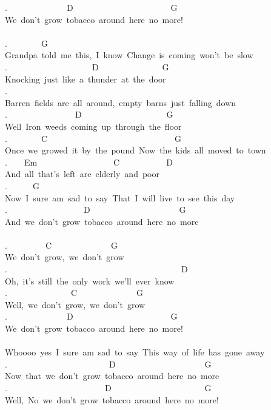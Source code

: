 {.\ \ \ \ \ \ \ \ \ \ \ \ \ \ D\ \ \ \ \ \ \ \ \ \ \ \ \ \ \ \ \ \ \ \ \ \ \ G\\
We\ don't\ grow\ tobacco\ around\ here\ no\ more!\\
\\
.\ \ \ \ \ \ \ \ G\\
Grandpa\ told\ me\ this,\ I\ know\ Change\ is\ coming\ won't\ be\ slow\\
.\ \ \ \ \ \ \ \ \ \ \ \ \ \ \ \ \ \ \ \ D\ \ \ \ \ \ \ \ \ \ \ \ \ \ \ G\\
Knocking\ just\ like\ a\ thunder\ at\ the\ door\\
.\\
Barren\ fields\ are\ all\ around,\ empty\ barns\ just\ falling\ down\\
.\ \ \ \ \ \ \ \ \ \ \ \ \ \ \ \ D\ \ \ \ \ \ \ \ \ \ \ \ \ \ \ \ \ \ \ \ G\\
Well\ Iron\ weeds\ coming\ up\ through\ the\ floor\\
.\ \ \ \ \ \ \ \ C\ \ \ \ \ \ \ \ \ \ \ \ \ \ \ \ \ \ \ \ \ \ \ \ \ \ \ \ \ \ G\\
Once\ we\ growed\ it\ by\ the\ pound\ Now\ the\ kids\ all\ moved\ to\ town\\
.\ \ \ \ Em\ \ \ \ \ \ \ \ \ \ \ \ \ \ \ \ \ \ C\ \ \ \ \ \ \ \ \ \ \ D\\
And\ all\ that's\ left\ are\ elderly\ and\ poor\\
.\ \ \ \ \ \ G\\
Now\ I\ sure\ am\ sad\ to\ say\ That\ I\ will\ live\ to\ see\ this\ day\\
.\ \ \ \ \ \ \ \ \ \ \ \ \ \ \ \ \ \ D\ \ \ \ \ \ \ \ \ \ \ \ \ \ \ \ \ \ \ \ \ G\\
And\ we\ don't\ grow\ tobacco\ around\ here\ no\ more\\
\\
.\ \ \ \ \ \ \ \ \ C\ \ \ \ \ \ \ \ \ \ \ \ \ \ G\\
We\ don't\ grow,\ we\ don't\ grow\\
.\ \ \ \ \ \ \ \ \ \ \ \ \ \ \ \ \ \ \ \ \ \ \ \ \ \ \ \ \ \ \ \ \ \ \ \ \ \ \ \ \ D\\
Oh,\ it's\ still\ the\ only\ work\ we'll\ ever\ know\\
.\ \ \ \ \ \ \ \ \ \ \ \ \ \ \ C\ \ \ \ \ \ \ \ \ \ \ \ \ \ G\\
Well,\ we\ don't\ grow,\ we\ don't\ grow\\
.\ \ \ \ \ \ \ \ \ \ \ \ \ \ D\ \ \ \ \ \ \ \ \ \ \ \ \ \ \ \ \ \ \ \ \ \ \ G\\
We\ don't\ grow\ tobacco\ around\ here\ no\ more!\\
\\
Whoooo\ yes\ I\ sure\ am\ sad\ to\ say\ This\ way\ of\ life\ has\ gone\ away\\
.\ \ \ \ \ \ \ \ \ \ \ \ \ \ \ \ \ \ \ \ \ \ \ \ D\ \ \ \ \ \ \ \ \ \ \ \ \ \ \ \ \ \ \ \ \ G\\
Now\ that\ we\ don't\ grow\ tobacco\ around\ here\ no\ more\\
.\ \ \ \ \ \ \ \ \ \ \ \ \ \ \ \ \ \ \ \ \ \ \ D\ \ \ \ \ \ \ \ \ \ \ \ \ \ \ \ \ \ \ \ \ \ G\\
Well,\ No\ we\ don't\ grow\ tobacco\ around\ here\ no\ more!}
